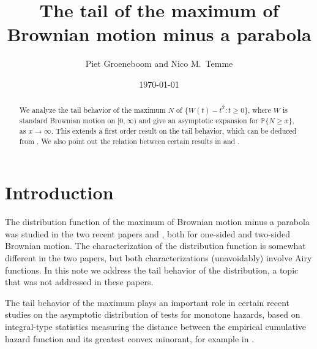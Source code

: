 \documentclass[11pt]{article}
\begin{document}
\title{The tail of the maximum of Brownian motion minus a parabola}
\author{Piet Groeneboom and Nico M.\ Temme}
\date{\today}
\maketitle
\begin{abstract}
We analyze the tail behavior of the maximum $N$ of $\{W(t)-t^2:t\ge0\}$, where $W$ is standard Brownian motion on $[0,\infty)$ and give an asymptotic expansion for ${{\mathbb P}}\{N\ge x\}$, as $x\to\infty$. This extends a first order result on the tail behavior, which can be deduced from {{\small \sc {}}}. We also point out the relation between certain results in {{\small \sc {}}} and {{\small \sc {}}}.
\end{abstract}

\section{Introduction}
\label{section:intro}
The distribution function of the maximum of Brownian motion minus a parabola was studied in the two recent papers {{\small \sc {}}} and {{\small \sc {}}}, both for one-sided and two-sided Brownian motion. The characterization of the distribution function is somewhat different in the two papers, but both characterizations (unavoidably) involve Airy functions. In this note we address the tail behavior of the distribution, a topic that was not addressed in these papers.

The tail behavior of the maximum plays an important role in certain recent studies on the asymptotic distribution of tests for monotone hazards, based on integral-type statistics measuring the distance between the empirical cumulative hazard function and its greatest convex minorant, for example in {{\small \sc {}}}.
\end{document}
